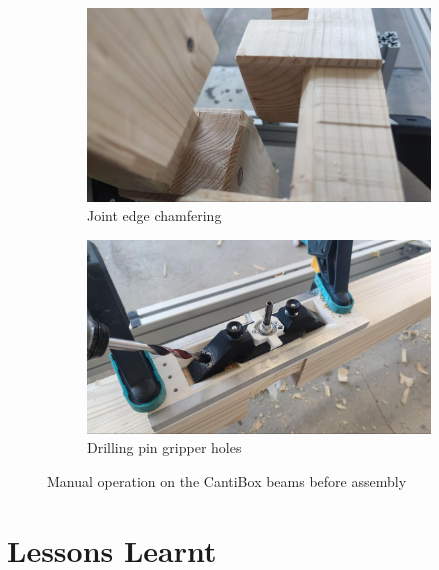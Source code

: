 \begin{figure}[!h]
    \centering
    \begin{subfigure}[b]{0.49\textwidth}
        \centering
        \includegraphics[width=\textwidth]{images/08/img28.jpg}
        \caption{Joint edge chamfering}
        \label{fig:joint-edge-chamfering}
    \end{subfigure}
    \hfill
    \begin{subfigure}[b]{0.49\textwidth}
        \centering
        \includegraphics[width=\textwidth]{images/08/img29.jpg}
        \caption{Drilling pin gripper holes}
        \label{fig:drilling-pin-gripper-holes}
    \end{subfigure}
    \caption{Manual operation on the CantiBox beams before assembly}
\end{figure}

\section{Lessons Learnt}
\label{section:exploration-5-lessons-learnt}

